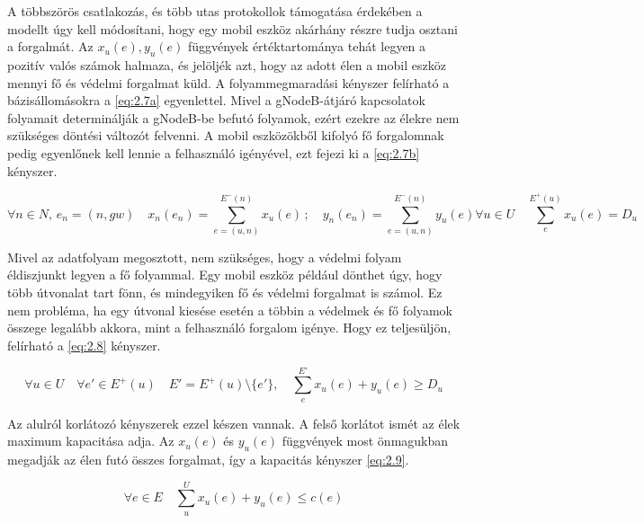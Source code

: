 \documentclass[a4paper,oneside]{article}
\newcommand{\inedge}[1]{E^-(#1)}
\newcommand{\outedge}[1]{E^+(#1)}
\begin{document}
A többszörös csatlakozás, és több utas protokollok támogatása érdekében a modellt úgy kell módosítani,
hogy egy mobil eszköz akárhány részre tudja osztani a forgalmát.
Az $x_u(e), y_u(e)$ függvények értéktartománya tehát legyen a pozitív valós számok halmaza, és jelöljék azt,
hogy az adott élen a mobil eszköz mennyi fő és védelmi forgalmat küld.
A folyammegmaradási kényszer felírható a bázisállomásokra a \eqref{eq:2.7a} egyenlettel.
Mivel a gNodeB-átjáró kapcsolatok folyamait determinálják a gNodeB-be befutó folyamok,
ezért ezekre az élekre nem szükséges döntési változót felvenni.
A mobil eszközökből kifolyó fő forgalomnak pedig egyenlőnek kell lennie a felhasználó igényével,
ezt fejezi ki a \eqref{eq:2.7b} kényszer.

\begin{subequations}
  \begin{equation}
    \forall n \in N, \, e_{n} = (n, gw) \quad
    x_n(e_n) = \sum_{e=(u,n)}^{\inedge{n}} x_u(e) \,; \quad
    y_n(e_n) = \sum_{e=(u,n)}^{\inedge{n}} y_u(e) \label{eq:2.7a}
  \end{equation}
  \begin{equation}
    \forall u \in U \quad \sum_{e}^{\outedge{u}} x_u(e) = D_u \label{eq:2.7b}
  \end{equation}
\end{subequations}

Mivel az adatfolyam megosztott, nem szükséges, hogy a védelmi folyam éldiszjunkt legyen a fő folyammal.
Egy mobil eszköz például dönthet úgy, hogy több útvonalat tart fönn, és mindegyiken fő és védelmi forgalmat is számol.
Ez nem probléma, ha egy útvonal kiesése esetén a többin a védelmek és fő folyamok összege legalább akkora, mint a felhasználó forgalom igénye.
Hogy ez teljesüljön, felírható a \eqref{eq:2.8} kényszer.

\begin{equation}
  \forall u \in U \quad \forall e' \in \outedge{u} \quad
  E' = \outedge{u} \setminus \lbrace e' \rbrace, \quad
  \sum_{e}^{E'} x_u(e) + y_u(e) \geq D_u \label{eq:2.8}
\end{equation}

Az alulról korlátozó kényszerek ezzel készen vannak. A felső korlátot ismét az élek maximum kapacitása adja.
Az $x_u(e)$ és $y_u(e)$ függvények most önmagukban megadják az élen futó összes forgalmat,
így a kapacitás kényszer \eqref{eq:2.9}.

\begin{equation}
  \forall e \in E \quad \sum_{u}^{U} x_u(e) + y_u(e) \leq c(e) \label{eq:2.9}
\end{equation}
\end{document}
